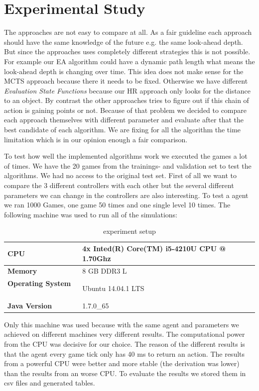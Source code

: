 
\section{Experimental Study} 
\label{sec:exp}

The approaches are not easy to compare at all. As a fair guideline each approach should have the same knowledge of the future e.g. the same look-ahead depth.
But since the approaches uses completely different strategies this is not possible. For example our \ac{EA} algorithm could have a
dynamic path length what means the look-ahead depth is changing over time. This idea does not make sense for the \ac{MCTS} approach because there it needs
to be fixed. Otherwise we have different \textit{Evaluation State Functions} because our \ac{HR} approach only looks for the distance to an object. By contrast 
the other approaches tries to figure out if this chain of action is gaining points or not.
Because of that problem we decided to compare each approach themselves with different parameter and evaluate after that the best candidate of each algorithm.
We are fixing for all the algorithm the time limitation which is in our opinion enough a fair comparison.

To test how well the implemented algorithms work we executed the games a lot of times. We have the 20 games from the trainings- and validation set to test the algorithms. We had no access to the original test set. First of all we want to compare the 3 different controllers with each other but the several different parameters we can change in the controllers are also interesting.
To test a agent we ran 1000 Games, one game 50 times and one single level 10 times. The following machine was used to run all of the simulations:

\begin{table}
\center
\begin{tabular}{ll} 
\textbf{CPU} & 4x Inted(R) Core(TM) i5-4210U CPU @ 1.70Ghz \\ \hline
\textbf{Memory} & 8 GB DDR3 L \\  \hline
\textbf{Operating System} \mbox{   } & Ubuntu 14.04.1 LTS \\  \hline
\textbf{Java Version} &  1.7.0\_65\\  
\end{tabular}
\caption{experiment setup}
\end{table}


Only this machine was used because with the same agent and parameters we achieved on different machines very different results. The computational power from the CPU was decisive for our choice. The reason of the different results is that the agent every game tick only has 40 ms to return an action. The results from a powerful CPU were better and more stable (the derivation was lower) than the results from an worse CPU. To evaluate the results we stored them in csv files and generated tables.

